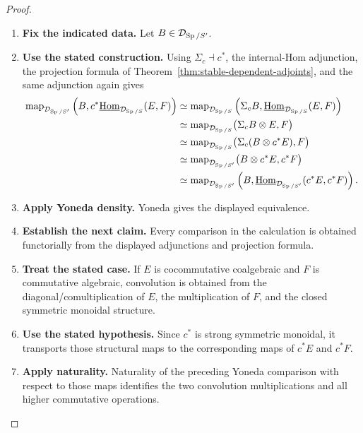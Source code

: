 \begin{proof}
\leavevmode
\begin{enumerate}[label=\textup{(\arabic*)}]
    \item \textbf{Fix the indicated data.}
    Let \(B\in\mathcal D_{\operatorname{Sp}/S'}\).
    \item \textbf{Use the stated construction.}
    Using
    \(\Sigma_c\dashv c^*\), the internal-Hom adjunction, the projection formula of
    Theorem~\ref{thm:stable-dependent-adjoints}, and the same adjunction again gives
    \[
    \begin{aligned}
    \operatorname{map}_{\mathcal D_{\operatorname{Sp}/S'}}
    \left(
    B,
    c^*\underline{\operatorname{Hom}}_{\mathcal D_{\operatorname{Sp}/S}}(E,F)
    \right)
    &\simeq
    \operatorname{map}_{\mathcal D_{\operatorname{Sp}/S}}
    \left(
    \Sigma_cB,
    \underline{\operatorname{Hom}}_{\mathcal D_{\operatorname{Sp}/S}}(E,F)
    \right)\\
    &\simeq
    \operatorname{map}_{\mathcal D_{\operatorname{Sp}/S}}
    \bigl(
    \Sigma_cB\otimes E,
    F
    \bigr)\\
    &\simeq
    \operatorname{map}_{\mathcal D_{\operatorname{Sp}/S}}
    \bigl(
    \Sigma_c(B\otimes c^*E),
    F
    \bigr)\\
    &\simeq
    \operatorname{map}_{\mathcal D_{\operatorname{Sp}/S'}}
    \bigl(
    B\otimes c^*E,
    c^*F
    \bigr)\\
    &\simeq
    \operatorname{map}_{\mathcal D_{\operatorname{Sp}/S'}}
    \left(
    B,
    \underline{\operatorname{Hom}}_{\mathcal D_{\operatorname{Sp}/S'}}
    (c^*E,c^*F)
    \right).
    \end{aligned}
    \]
    \item \textbf{Apply Yoneda density.}
    Yoneda gives the displayed equivalence.
    \item \textbf{Establish the next claim.}
    Every comparison in the calculation
    is obtained functorially from the displayed adjunctions and projection formula.
    \item \textbf{Treat the stated case.}
    If \(E\) is cocommutative coalgebraic and \(F\) is commutative algebraic,
    convolution is obtained from the diagonal/comultiplication of \(E\), the
    multiplication of \(F\), and the closed symmetric monoidal structure.
    \item \textbf{Use the stated hypothesis.}
    Since \(c^*\) is strong symmetric monoidal, it transports those structural maps
    to the corresponding maps of \(c^*E\) and \(c^*F\).
    \item \textbf{Apply naturality.}
    Naturality of the
    preceding Yoneda comparison with respect to those maps identifies the two
    convolution multiplications and all higher commutative operations.
\end{enumerate}
\end{proof}

